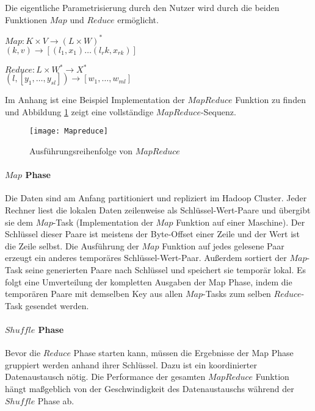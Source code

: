 Die eigentliche Parametrisierung durch den Nutzer wird durch die beiden Funktionen $Map$ und $Reduce$ ermöglicht.

\begin{center}
    $Map: K \times V \rightarrow (L \times W)^\ast$\\$(k, v) \rightarrow [(l_1, x_1) \dots (l_rk, x_{rk})]$
\end{center}
\begin{center}
    $Reduce: L \times W^\ast \rightarrow X^\ast$\\$(l, [y_1, \dots, y_{sl}]) \rightarrow [w_1, \dots, w_{ml}]$
\end{center}

Im Anhang ist eine Beispiel Implementation der $MapReduce$ Funktion zu finden und Abbildung \ref{fig:mapreduce} zeigt eine vollständige $MapReduce$-Sequenz.

\begin{figure}[h!]
    \centering
    \texttt{[image: Mapreduce]}
    \caption{Ausführungsreihenfolge von $MapReduce$\cite{dg04}}
    \label{fig:mapreduce}
\end{figure}

\paragraph{$Map$ Phase}$\;$ \\
Die Daten sind am Anfang partitioniert und repliziert im Hadoop Cluster. Jeder Rechner liest die lokalen Daten zeilenweise als Schlüssel-Wert-Paare und übergibt sie dem $Map$-Task (Implementation der $Map$ Funktion auf einer Maschine). Der Schlüssel dieser Paare ist meistens der Byte-Offset einer Zeile und der Wert ist die Zeile selbst. Die Ausführung der $Map$ Funktion auf jedes gelesene Paar erzeugt ein anderes temporäres Schlüssel-Wert-Paar. Außerdem sortiert der $Map$-Task seine generierten Paare nach Schlüssel und speichert sie temporär lokal. Es folgt eine Umverteilung der kompletten Ausgaben der Map Phase, indem die temporären Paare mit demselben Key aus allen $Map$-Tasks zum selben $Reduce$-Task gesendet werden.

\paragraph{$Shuffle$ Phase}$\;$ \\
Bevor die $Reduce$ Phase starten kann, müssen die Ergebnisse der Map Phase gruppiert werden anhand ihrer Schlüssel. Dazu ist ein koordinierter Datenaustausch nötig. Die Performance der gesamten $MapReduce$ Funktion hängt maßgeblich von der Geschwindigkeit des Datenaustauschs während der $Shuffle$ Phase ab.

